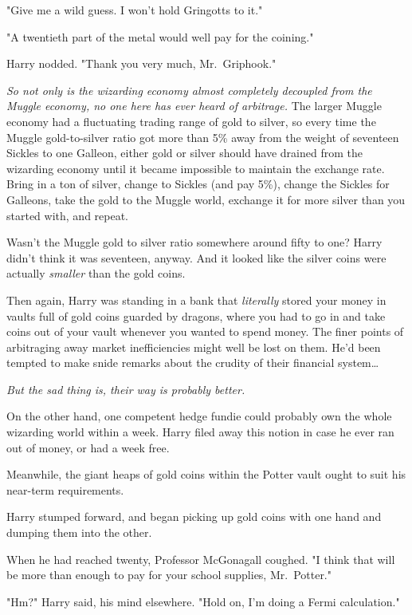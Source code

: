 "Give me a wild guess. I won't hold Gringotts to it."

"A twentieth part of the metal would well pay for the coining."

Harry nodded. "Thank you very much, Mr.~Griphook."

\emph{So not only is the wizarding economy almost completely decoupled from the 
Muggle economy, no one here has ever heard of arbitrage.} The larger Muggle 
economy had a fluctuating trading range of gold to silver, so every time the 
Muggle gold-to-silver ratio got more than 5\% away from the weight of seventeen 
Sickles to one Galleon, either gold or silver should have drained from the 
wizarding economy until it became impossible to maintain the exchange rate. 
Bring in a ton of silver, change to Sickles (and pay 5\%), change the Sickles 
for Galleons, take the gold to the Muggle world, exchange it for more silver 
than you started with, and repeat.

Wasn't the Muggle gold to silver ratio somewhere around fifty to one? Harry 
didn't think it was seventeen, anyway. And it looked like the silver coins were 
actually \emph{smaller} than the gold coins.

Then again, Harry was standing in a bank that \emph{literally} stored your 
money in vaults full of gold coins guarded by dragons, where you had to go in 
and take coins out of your vault whenever you wanted to spend money. The finer 
points of arbitraging away market inefficiencies might well be lost on them. 
He'd been tempted to make snide remarks about the crudity of their financial 
system{\ldots}

\emph{But the sad thing is, their way is probably better.}

On the other hand, one competent hedge fundie could probably own the whole 
wizarding world within a week. Harry filed away this notion in case he ever ran 
out of money, or had a week free.

Meanwhile, the giant heaps of gold coins within the Potter vault ought to suit 
his near-term requirements.

Harry stumped forward, and began picking up gold coins with one hand and 
dumping them into the other.

When he had reached twenty, Professor McGonagall coughed. "I think that will be 
more than enough to pay for your school supplies, Mr.~Potter."

"Hm?" Harry said, his mind elsewhere. "Hold on, I'm doing a Fermi calculation."

